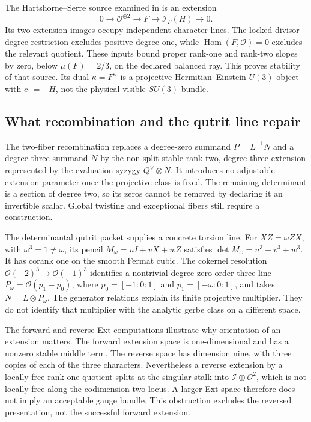\documentclass[11pt]{article}
\theoremstyle{definition}
\theoremstyle{remark}
\begin{document}
The Hartshorne--Serre source examined in \cite{FRG3F} is an extension
\[
0\longrightarrow\mathcal O^{\oplus2}\longrightarrow F
\longrightarrow\mathcal I_\Gamma(H)\longrightarrow0.
\]
Its two extension images occupy independent character lines.  The locked
divisor-degree restriction excludes positive degree one, while
\(\operatorname{Hom}(F,\mathcal O)=0\) excludes the relevant quotient.
These inputs bound proper rank-one and rank-two slopes by zero, below
\(\mu(F)=2/3\), on the declared balanced ray.  This proves stability of
that source.  Its dual \(\kappa=F^\vee\) is a projective Hermitian--Einstein
\(U(3)\) object with \(c_1=-H\), not the physical visible \(SU(3)\) bundle.

\subsection{What recombination and the qutrit line repair}
\label{sec:recombination}

The two-fiber recombination \cite{FRG3G} replaces a degree-zero summand
\(P=L^{-1}N\) and a degree-three summand \(N\) by the non-split stable
rank-two, degree-three extension represented by the evaluation syzygy
\(Q^\vee\otimes N\).  It introduces no adjustable extension parameter
once the projective class is fixed.  The remaining determinant is a section
of degree two, so its zeros cannot be removed by declaring it an invertible
scalar.  Global twisting and exceptional fibers still require a construction.

The determinantal qutrit packet \cite{FRG3H} supplies a concrete torsion
line.  For \(XZ=\omega ZX\), with \(\omega^3=1\ne\omega\), its pencil
\(M_\omega=uI+vX+wZ\) satisfies
\(\det M_\omega=u^3+v^3+w^3\).  It has corank one on the smooth Fermat
cubic.  The cokernel resolution
\(\mathcal O(-2)^3\to\mathcal O(-1)^3\) identifies a nontrivial
degree-zero order-three line
\(P_\omega=\mathcal O(p_1-p_0)\), where
\(p_0=[-1:0:1]\) and \(p_1=[-\omega:0:1]\), and takes
\(N=L\otimes P_\omega\).  The generator relations explain its finite
projective multiplier.  They do not identify that multiplier with the
analytic gerbe class on a different space.

The forward and reverse Ext computations \cite{FRG3I,FRG3J} illustrate why
orientation of an extension matters.  The forward extension space is
one-dimensional and has a nonzero stable middle term.  The reverse space
has dimension nine, with three copies of each of the three characters.
Nevertheless a reverse extension by a locally free rank-one quotient
splits at the singular stalk into \(\mathcal I\oplus\mathcal O^2\), which
is not locally free along the codimension-two locus.  A larger Ext space
therefore does not imply an acceptable gauge bundle.  This obstruction
excludes the reversed presentation, not the successful forward extension.
\end{document}
